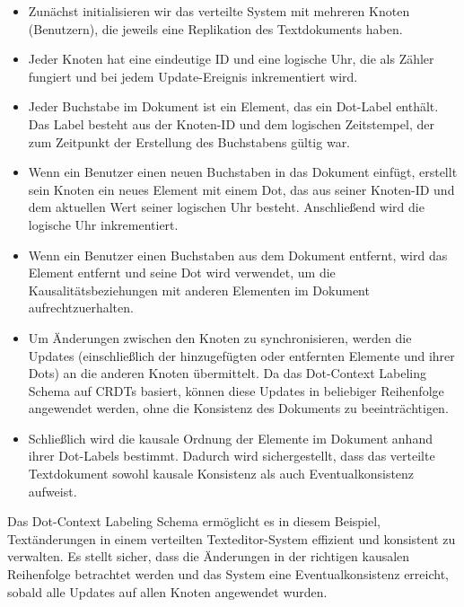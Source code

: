 \begin{itemize}
\item Zunächst initialisieren wir das verteilte System mit mehreren Knoten (Benutzern), die jeweils eine Replikation des Textdokuments haben.
\item Jeder Knoten hat eine eindeutige ID und eine logische Uhr, die als Zähler fungiert und bei jedem Update-Ereignis inkrementiert wird.
\item Jeder Buchstabe im Dokument ist ein Element, das ein Dot-Label enthält. Das Label besteht aus der Knoten-ID und dem logischen Zeitstempel, der zum Zeitpunkt der Erstellung des Buchstabens gültig war.
\item Wenn ein Benutzer einen neuen Buchstaben in das Dokument einfügt, erstellt sein Knoten ein neues Element mit einem Dot, das aus seiner Knoten-ID und dem aktuellen Wert seiner logischen Uhr besteht. Anschließend wird die logische Uhr inkrementiert.
\item Wenn ein Benutzer einen Buchstaben aus dem Dokument entfernt, wird das Element entfernt und seine Dot wird verwendet, um die Kausalitätsbeziehungen mit anderen Elementen im Dokument aufrechtzuerhalten.
\item Um Änderungen zwischen den Knoten zu synchronisieren, werden die Updates (einschließlich der hinzugefügten oder entfernten Elemente und ihrer Dots) an die anderen Knoten übermittelt. Da das Dot-Context Labeling Schema auf CRDTs basiert, können diese Updates in beliebiger Reihenfolge angewendet werden, ohne die Konsistenz des Dokuments zu beeinträchtigen.
\item Schließlich wird die kausale Ordnung der Elemente im Dokument anhand ihrer Dot-Labels bestimmt. Dadurch wird sichergestellt, dass das verteilte Textdokument sowohl kausale Konsistenz als auch Eventualkonsistenz aufweist.
\end{itemize}
Das Dot-Context Labeling Schema ermöglicht es in diesem Beispiel, Textänderungen in einem verteilten Texteditor-System effizient und konsistent zu verwalten. Es stellt sicher, dass die Änderungen in der richtigen kausalen Reihenfolge betrachtet werden und das System eine Eventualkonsistenz erreicht, sobald alle Updates auf allen Knoten angewendet wurden.

